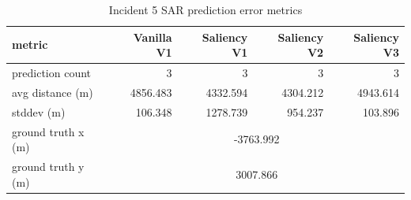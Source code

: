 \begin{table}[ht]
\centering
\caption{Incident 5 SAR prediction error metrics}
\label{tab:sar-incident-5}
\begin{tabular}{lrrrr}
\hline
metric & Vanilla V1 & Saliency V1 & Saliency V2 & Saliency V3 \\
\hline
prediction count & 3 & 3 & 3 & 3 \\
avg distance (m) & 4856.483 & 4332.594 & 4304.212 & 4943.614 \\
stddev (m) & 106.348 & 1278.739 & 954.237 & 103.896 \\
ground truth x (m) & \multicolumn{4}{c}{-3763.992} \\
ground truth y (m) & \multicolumn{4}{c}{3007.866} \\
\hline
\end{tabular}
\end{table}
